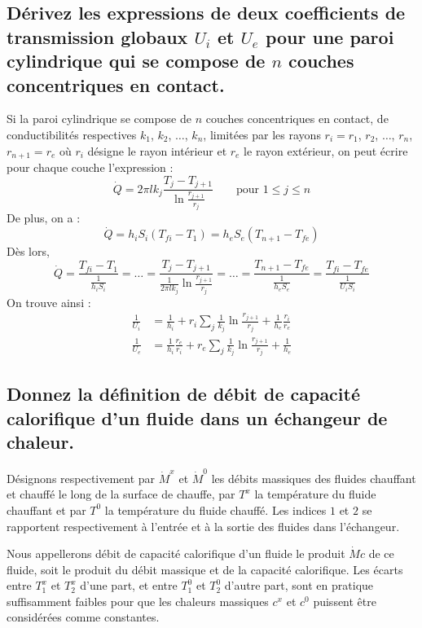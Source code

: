 \subsection{Dérivez les expressions de deux coefficients de transmission globaux $U_i$ et $U_e$ pour une paroi cylindrique qui se compose de $n$ couches concentriques en contact.}
Si la paroi cylindrique se compose de $n$ couches concentriques en contact, de conductibilités respectives $k_1$, $k_2$, $\ldots$, $k_n$, limitées par les rayons $r_i = r_1$, $r_2$, $\ldots$, $r_n$, $r_{n+1} = r_e$ où $r_i$ désigne le rayon intérieur et $r_e$ le rayon extérieur, on peut écrire pour chaque couche l'expression :
\begin{equation} \dot{Q} = 2\pi lk_j\frac{T_j-T_{j+1}}{\ln\frac{r_{j+1}}{r_j}} \qquad \text{pour } 1\leq j\leq n \end{equation}
De plus, on a :
\begin{equation} \dot{Q} = h_iS_i(T_{fi}-T_1) = h_eS_e(T_{n+1} - T_{fe}) \end{equation}
Dès lors,
\begin{equation} \dot{Q} = \frac{T_{fi}-T_1}{\frac{1}{h_iS_i}} = \ldots = \frac{T_j-T_{j+1}}{\frac{1}{2\pi lk_j}\ln\frac{r_{j+1}}{r_j}} = \ldots = \frac{T_{n+1}-T_{fe}}{\frac{1}{h_eS_e}} = \frac{T_{fi}-T_{fe}}{\frac{1}{U_iS_i}} \end{equation}
On trouve ainsi :
\begin{align} \frac{1}{U_i} &= \frac{1}{h_i} + r_i\sum_j\frac{1}{k_j}\ln\frac{r_{j+1}}{r_j} + \frac{1}{h_e}\frac{r_i}{r_e} \\ \frac{1}{U_e} &= \frac{1}{h_i}\frac{r_e}{r_i} + r_e\sum_j\frac{1}{k_j}\ln\frac{r_{j+1}}{r_j} + \frac{1}{h_e} \end{align}

\subsection{Donnez la définition de débit de capacité calorifique d'un fluide dans un échangeur de chaleur.}
Désignons respectivement par $\dot{M}^x$ et $\dot{M}^0$ les débits massiques des fluides chauffant et chauffé le long de la surface de chauffe, par $T^x$ la température du fluide chauffant et par $T^0$ la température du fluide chauffé. Les indices $1$ et $2$ se rapportent respectivement à l'entrée et à la sortie des fluides dans l'échangeur.

Nous appellerons débit de capacité calorifique d'un fluide le produit $\dot{M}c$ de ce fluide, soit le produit du débit massique et de la capacité calorifique. Les écarts entre $T_1^x$ et $T_2^x$ d'une part, et entre $T_1^0$ et $T_2^0$ d'autre part, sont en pratique suffisamment faibles pour que les chaleurs massiques $c^x$ et $c^0$ puissent être considérées comme constantes.


